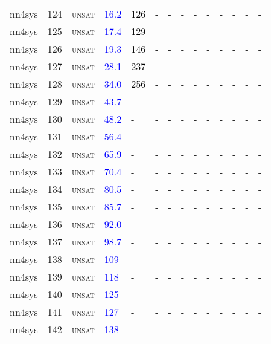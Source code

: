 \begin{center}
{\begin{longtable}{@{}llllllllllllll@{}}
nn4sys & 124 & \textsc{unsat} & \textcolor{blue}{16.2} & \textcolor{black}{126} & - & - & - & - & - & - & - & - & - \\
nn4sys & 125 & \textsc{unsat} & \textcolor{blue}{17.4} & \textcolor{black}{129} & - & - & - & - & - & - & - & - & - \\
nn4sys & 126 & \textsc{unsat} & \textcolor{blue}{19.3} & \textcolor{black}{146} & - & - & - & - & - & - & - & - & - \\
nn4sys & 127 & \textsc{unsat} & \textcolor{blue}{28.1} & \textcolor{black}{237} & - & - & - & - & - & - & - & - & - \\
nn4sys & 128 & \textsc{unsat} & \textcolor{blue}{34.0} & \textcolor{black}{256} & - & - & - & - & - & - & - & - & - \\
nn4sys & 129 & \textsc{unsat} & \textcolor{blue}{43.7} & - & - & - & - & - & - & - & - & - & - \\
nn4sys & 130 & \textsc{unsat} & \textcolor{blue}{48.2} & - & - & - & - & - & - & - & - & - & - \\
nn4sys & 131 & \textsc{unsat} & \textcolor{blue}{56.4} & - & - & - & - & - & - & - & - & - & - \\
nn4sys & 132 & \textsc{unsat} & \textcolor{blue}{65.9} & - & - & - & - & - & - & - & - & - & - \\
nn4sys & 133 & \textsc{unsat} & \textcolor{blue}{70.4} & - & - & - & - & - & - & - & - & - & - \\
nn4sys & 134 & \textsc{unsat} & \textcolor{blue}{80.5} & - & - & - & - & - & - & - & - & - & - \\
nn4sys & 135 & \textsc{unsat} & \textcolor{blue}{85.7} & - & - & - & - & - & - & - & - & - & - \\
nn4sys & 136 & \textsc{unsat} & \textcolor{blue}{92.0} & - & - & - & - & - & - & - & - & - & - \\
nn4sys & 137 & \textsc{unsat} & \textcolor{blue}{98.7} & - & - & - & - & - & - & - & - & - & - \\
nn4sys & 138 & \textsc{unsat} & \textcolor{blue}{109} & - & - & - & - & - & - & - & - & - & - \\
nn4sys & 139 & \textsc{unsat} & \textcolor{blue}{118} & - & - & - & - & - & - & - & - & - & - \\
nn4sys & 140 & \textsc{unsat} & \textcolor{blue}{125} & - & - & - & - & - & - & - & - & - & - \\
nn4sys & 141 & \textsc{unsat} & \textcolor{blue}{127} & - & - & - & - & - & - & - & - & - & - \\
nn4sys & 142 & \textsc{unsat} & \textcolor{blue}{138} & - & - & - & - & - & - & - & - & - & - \\

\end{longtable}}
\end{center}
